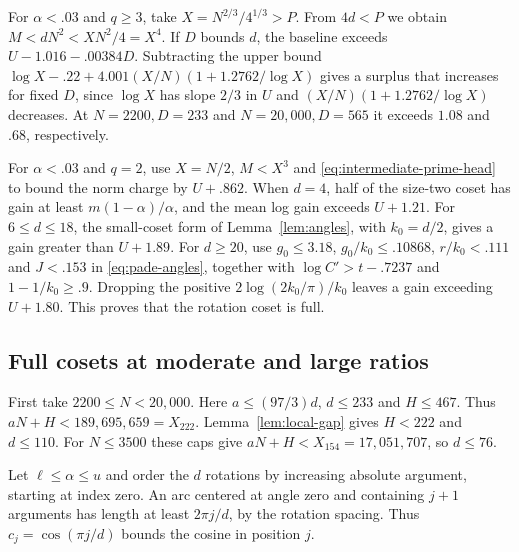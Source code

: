 For \(\alpha<.03\) and \(q\ge3\), take
\(X=N^{2/3}/4^{1/3}>P\). From \(4d<P\) we obtain
\(M<dN^2<XN^2/4=X^4\).
If \(D\) bounds \(d\), the baseline exceeds
\(U-1.016-.00384D\).
Subtracting the upper bound
\(\log X-.22+4.001(X/N)(1+1.2762/\log X)\)
gives a surplus that increases for fixed \(D\), since
\(\log X\) has slope \(2/3\) in \(U\) and
\((X/N)(1+1.2762/\log X)\) decreases.
At \(N=2200,D=233\) and \(N=20{,}000,D=565\) it
exceeds \(1.08\) and \(.68\), respectively.

For \(\alpha<.03\) and \(q=2\), use \(X=N/2\), \(M<X^3\)
and \eqref{eq:intermediate-prime-head} to bound the norm
charge by \(U+.862\).
When \(d=4\), half of the size-two coset has gain at least
\(m(1-\alpha)/\alpha\), and the mean log gain exceeds
\(U+1.21\). For \(6\le d\le18\), the small-coset form of
Lemma~\ref{lem:angles}, with \(k_0=d/2\), gives a gain greater
than \(U+1.89\). For \(d\ge20\), use \(g_0\le3.18\),
\(g_0/k_0\le.10868\), \(r/k_0<.111\) and \(J<.153\)
in \eqref{eq:pade-angles}, together with
\(\log C'>t-.7237\) and \(1-1/k_0\ge.9\).
Dropping the positive \(2\log(2k_0/\pi)/k_0\) leaves a gain
exceeding \(U+1.80\).
This proves that the rotation coset is full.

\subsection{Full cosets at moderate and large ratios}

First take \(2200\le N<20{,}000\).
Here \(a\le(97/3)d\), \(d\le233\) and \(H\le467\).
Thus \(aN+H<189{,}695{,}659=X_{222}\).
Lemma~\ref{lem:local-gap} gives \(H<222\) and \(d\le110\).
For \(N\le3500\) these caps give \(aN+H<X_{154}=17{,}051{,}707\),
so \(d\le76\).

Let \(\ell\le\alpha\le u\) and order the \(d\) rotations by
increasing absolute argument, starting at index zero. An arc
centered at angle zero and containing \(j+1\) arguments has
length at least \(2\pi j/d\), by the rotation spacing.
Thus \(c_j=\cos(\pi j/d)\) bounds the cosine in position \(j\).

